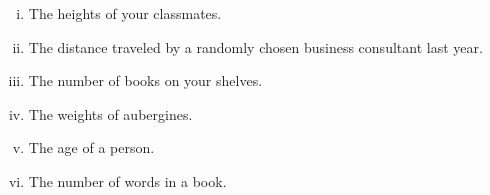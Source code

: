 \documentclass[]{report}
\begin{document}
\begin{enumerate}
\begin{enumerate}[(i)]
\item 
The heights of your classmates.

\item The distance traveled by a randomly chosen business consultant last year.

\item 

The number of books on your shelves.
\item 
The weights of aubergines.


\item 

The age of a person.

\item The number of words in a book.

\end{enumerate}
\end{enumerate}
\end{document}
